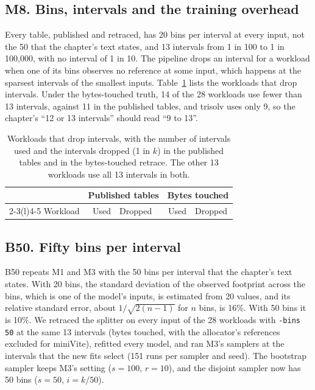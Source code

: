 \documentclass[11pt]{article}
\newcommand{\tabinput}[1]{}
\begin{document}
\subsection{M8. Bins, intervals and the training overhead}
\label{sec:m8}

Every table, published and retraced, has 20 bins per interval at every input, not the 50 that the chapter's text
states, and 13 intervals from 1 in 100 to 1 in 100,000, with no interval of 1 in 10. The pipeline drops an interval
for a workload when one of its bins observes no reference at some input, which happens at the sparsest intervals
of the smallest inputs. Table~\ref{tab:m8} lists the workloads that drop intervals. Under the bytes-touched truth,
14 of the 28 workloads use fewer than 13 intervals, against 11 in the published tables, and trisolv uses only 9, so the chapter's ``12 or 13
intervals'' should read ``9 to 13''.

\begin{table}[htbp]
\centering
\caption{Workloads that drop intervals, with the number of intervals used and the intervals dropped (1 in $k$) in the
published tables and in the bytes-touched retrace. The other 13 workloads use all 13 intervals in both.}
\label{tab:m8}
\small
\begin{tabular}{@{}lrlrl@{}}
\toprule
& \multicolumn{2}{c}{Published tables} & \multicolumn{2}{c}{Bytes touched} \\
\cmidrule(lr){2-3}\cmidrule(l){4-5}
Workload & Used & Dropped & Used & Dropped \\
\midrule
\tabinput{m8}
\bottomrule
\end{tabular}
\end{table}

\subsection{B50. Fifty bins per interval}
\label{sec:b50}

B50 repeats M1 and M3 with the 50 bins per interval that the chapter's text states. With 20 bins, the standard
deviation of the observed footprint across the bins, which is one of the model's inputs, is estimated from 20
values, and its relative standard error, about $1/\sqrt{2(n-1)}$ for $n$ bins, is 16\%. With 50 bins it is 10\%.
We retraced the splitter on every input of the 28 workloads with \texttt{-bins 50} at the same 13 intervals
(bytes touched, with the allocator's references excluded for miniVite), refitted every model, and ran M3's samplers
at the intervals that the new fits select (151 runs per sampler and seed). The bootstrap sampler keeps M3's setting
($s = 100$, $r = 10$), and the disjoint sampler now has 50 bins ($s = 50$, $i = k/50$).
\end{document}
